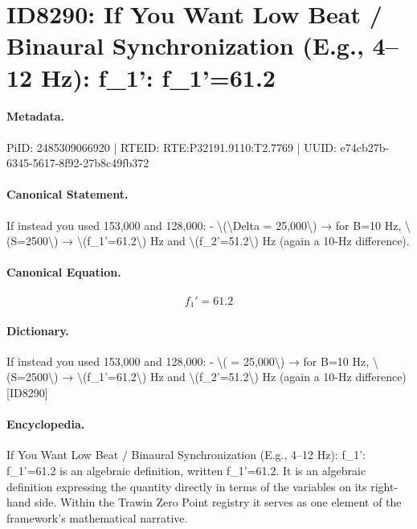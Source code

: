 \section*{ID8290: If You Want Low Beat / Binaural Synchronization (E.g., 4–12 Hz): f\_1': f\_1'=61.2}
\paragraph{Metadata.}
PiID: 2485309066920 | RTEID: RTE:P32191.9110:T2.7769 | UUID: e74cb27b-6345-5617-8f92-27b8c49fb372

\paragraph{Canonical Statement.}
If instead you used 153,000 and 128,000: - \textbackslash{}(\textbackslash{}Delta = 25,000\textbackslash{}) → for B=10 Hz, \textbackslash{}(S=2500\textbackslash{}) → \textbackslash{}(f\_1'=61.2\textbackslash{}) Hz and \textbackslash{}(f\_2'=51.2\textbackslash{}) Hz (again a 10-Hz difference).

\paragraph{Canonical Equation.}
\[
f_1'=61.2
\]

\paragraph{Dictionary.}
If instead you used 153,000 and 128,000: - \textbackslash{}( = 25,000\textbackslash{}) → for B=10 Hz, \textbackslash{}(S=2500\textbackslash{}) → \textbackslash{}(f\_1'=61.2\textbackslash{}) Hz and \textbackslash{}(f\_2'=51.2\textbackslash{}) Hz (again a 10-Hz difference) [ID8290]

\paragraph{Encyclopedia.}
If You Want Low Beat / Binaural Synchronization (E.g., 4–12 Hz): f\_1': f\_1'=61.2 is an algebraic definition, written f\_1'=61.2. It is an algebraic definition expressing the quantity directly in terms of the variables on its right-hand side. Within the Trawin Zero Point registry it serves as one element of the framework's mathematical narrative.
